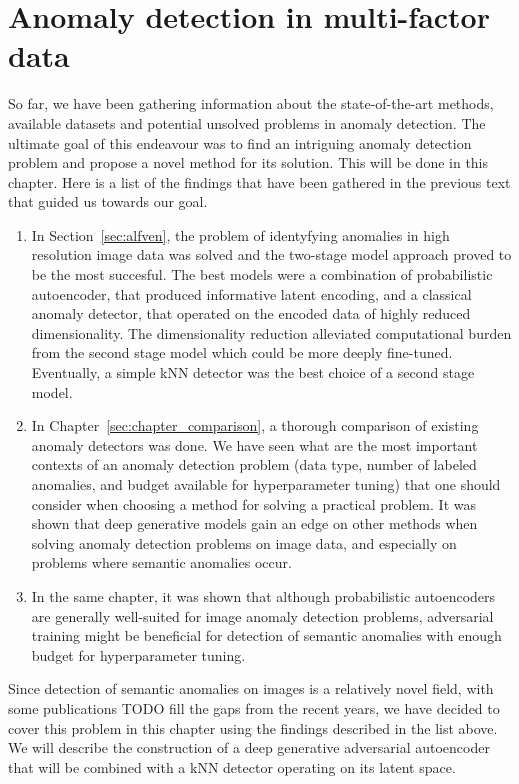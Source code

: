 \chapter{Anomaly detection in multi-factor data} \label{sec:chapter_sgvaegan}

So far, we have been gathering information about the state-of-the-art methods, available datasets and potential unsolved problems in anomaly detection. The ultimate goal of this endeavour was to find an intriguing anomaly detection problem and propose a novel method for its solution. This will be done in this chapter. Here is a list of the findings that have been gathered in the previous text that guided us towards our goal.

\begin{enumerate}
    \item In Section~\ref{sec:alfven}, the problem of identyfying anomalies in high resolution image data was solved and the two-stage model approach proved to be the most succesful. The best models were a combination of probabilistic autoencoder, that produced informative latent encoding, and a classical anomaly detector, that operated on the encoded data of highly reduced dimensionality. The dimensionality reduction alleviated computational burden from the second stage model which could be more deeply fine-tuned. Eventually, a simple kNN detector was the best choice of a second stage model. 
    \item In Chapter~\ref{sec:chapter_comparison}, a thorough comparison of existing anomaly detectors was done. We have seen what are the most important contexts of an anomaly detection problem (data type, number of labeled anomalies, and budget available for hyperparameter tuning) that one should consider when choosing a method for solving a practical problem. It was shown that deep generative models gain an edge on other methods when solving anomaly detection problems on image data, and especially on problems where semantic anomalies occur. 
    \item In the same chapter, it was shown that although probabilistic autoencoders are generally well-suited for image anomaly detection problems, adversarial training might be beneficial for detection of semantic anomalies with enough budget for hyperparameter tuning.
\end{enumerate}
Since detection of semantic anomalies on images is a relatively novel field, with some publications TODO fill the gaps from the recent years, we have decided to cover this problem in this chapter using the findings described in the list above. We will describe the construction of a deep generative adversarial autoencoder that will be combined with a kNN detector operating on its latent space.






